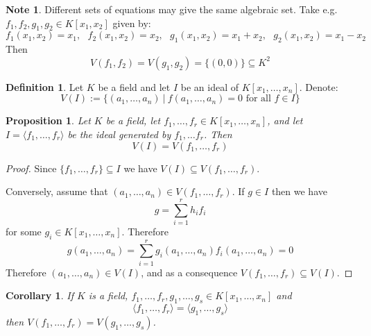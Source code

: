 \documentclass[12pt, letterpaper, oneside]{article}
\theoremstyle{plain}
\newtheorem{proposition}[theorem]{Proposition}
\newtheorem{corollary}[theorem]{Corollary}
\theoremstyle{definition}
\newtheorem{definition}[theorem]{Definition}
\newtheorem{note}[theorem]{Note}
\newcommand{\subgp}[1]{\langle#1\rangle}
\newcommand{\vs}{\vskip 5mm}
\begin{document}
\vs\vs

\begin{note}
Different sets of equations may give the same algebraic set. Take e.g. 
$f_{1}, f_{2}, g_{1}, g_{2}\in K[x_{1}, x_{2}]$ given by:
$$f_{1}(x_{1}, x_{2}) = x_{1}, \ \ \ f_{2}(x_{1}, x_{2}) = x_{2}, \ \ \ 
g_{1}(x_{1}, x_{2}) = x_{1}+x_{2}, \ \ \ g_{2}(x_{1}, x_{2}) = x_{1}-x_{2}$$
Then 
$$V(f_{1}, f_{2}) = V(g_{1}, g_{2}) = \{(0, 0)\} \subseteq K^{2}$$
\end{note}



\vs\vs

\begin{definition}
Let $K$ be a field and let $I$ be an ideal of $K[x_{1}, \dots, x_{n}]$. Denote:
$$V(I) := \{(a_{1}, \dots, a_{n}) \ |  \ f(a_{1}, \dots, a_{n}) = 0 \text{ for all } f\in I \}$$
\end{definition}

\vs\vs

\begin{proposition}
\label{PROP_VIVF}
Let $K$ be a field,  let $f_{1}, \dots, f_{r} \in K[x_{1}, \dots, x_{n}]$, and let 
$I = \subgp{f_{1}, \dots, f_{r}}$ be the ideal generated by 
$f_{1}, \dots f_{r}$. Then 
$$V(I) = V(f_{1}, \dots, f_{r})$$
 \end{proposition}
 
 \vs
 
 \begin{proof}
Since $\{f_{1}, \dots, f_{r}\} \subseteq I$ we have $V(I) \subseteq V(f_{1}, \dots, f_{r})$. 

Conversely, assume that  $(a_{1}, \dots, a_{n})\in V(f_{1}, \dots, f_{r})$. If $g\in I$ then 
we have
$$g = \sum_{i=1}^{r}h_{i}f_{i}$$
for some $g_{i}\in K[x_{1}, \dots, x_{n}]$. Therefore 
$$g(a_{1}, \dots, a_{n}) = \sum_{i=1}^{r} g_{i}(a_{1}, \dots, a_{n})f_{i}(a_{1}, \dots, a_{n}) = 0$$
Therefore  $(a_{1}, \dots, a_{n})\in V(I)$, and as a consequence $V(f_{1}, \dots, f_{r}) \subseteq V(I)$.  
 \end{proof}
 
 \vs\vs
 
 \begin{corollary}
 If $K$ is a field, $f_{1}, \dots, f_{r}, g_{1}, \dots, g_{s} \in K[x_{1}, \dots, x_{n}]$ and 
 $$\subgp{f_{1}, \dots, f_{r}} = \subgp{g_{1}, \dots, g_{s}}$$
 then $V(f_{1}, \dots, f_{r}) = V(g_{1}, \dots, g_{s})$. 
 \end{corollary} 
 
\end{document}
